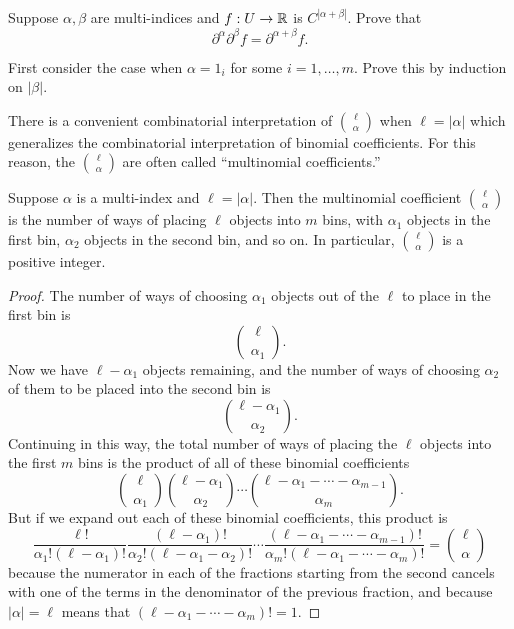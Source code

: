 \begin{exercise} \label{mixed-partials-multi-index}
	Suppose $\alpha, \beta$ are multi-indices and $f : U \to \mathbb{R}$ is $C^{|\alpha + \beta|}$. Prove that \[ \partial^\alpha \partial^\beta f = \partial^{\alpha + \beta} f. \] 
	\begin{hint}
		First consider the case when $\alpha = 1_i$ for some $i = 1, \dotsc, m$. Prove this by induction on $|\beta|$. 
	\end{hint}
\end{exercise}

There is a convenient combinatorial interpretation of $\binom{\ell}{\alpha}$ when $\ell = |\alpha|$ which generalizes the combinatorial interpretation of binomial coefficients. For this reason, the $\binom{\ell}{\alpha}$ are often called ``multinomial coefficients.''

\begin{theorem} \label{multinomial-combinatorial}
	Suppose $\alpha$ is a multi-index and $\ell = |\alpha|$. Then the multinomial coefficient $\binom{\ell}{\alpha}$ is the number of ways of placing $\ell$ objects into $m$ bins, with $\alpha_1$ objects in the first bin, $\alpha_2$ objects in the second bin, and so on. In particular, $\binom{\ell}{\alpha}$ is a positive integer. 
\end{theorem}

\begin{proof}
	The number of ways of choosing $\alpha_1$ objects out of the $\ell$ to place in the first bin is
	\[ \binom{\ell}{\alpha_1}. \]
	Now we have $\ell - \alpha_1$ objects remaining, and the number of ways of choosing $\alpha_2$ of them to be placed into the second bin is 
	\[ \binom{\ell - \alpha_1}{\alpha_2}. \]
	Continuing in this way, the total number of ways of placing the $\ell$ objects into the first $m$ bins is the product of all of these binomial coefficients
	\[ \binom{\ell}{\alpha_1} \binom{\ell - \alpha_1}{\alpha_2} \dotsb \binom{\ell - \alpha_1 - \dotsb - \alpha_{m-1}}{\alpha_m}. \]
	But if we expand out each of these binomial coefficients, this product is 
	\[ \frac{\ell!}{\alpha_1!(\ell - \alpha_1)!} \frac{(\ell - \alpha_1)!}{\alpha_2!(\ell - \alpha_1 - \alpha_2)!} \dotsb \frac{(\ell - \alpha_1 - \dotsb - \alpha_{m-1})!}{\alpha_m!(\ell - \alpha_1 - \dotsb - \alpha_m)!} = \binom{\ell}{\alpha} \]
	because the numerator in each of the fractions starting from the second cancels with one of the terms in the denominator of the previous fraction, and because $|\alpha| = \ell$ means that $(\ell - \alpha_1 - \dotsb - \alpha_m)! = 1$. 
\end{proof}

